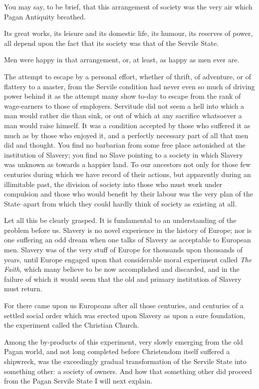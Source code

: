 \documentclass{book}
\begin{document}
You may say, to be brief, that this arrangement of society was the very air which Pagan Antiquity breathed.

Its great works, its leisure and its domestic life, its humour, its reserves of power, all depend upon the fact that its society was that of the Servile State.

Men were happy in that arrangement, or, at least, as happy as men ever are.

The attempt to escape by a personal effort, whether of thrift, of adventure, or of flattery to a master, from the Servile condition had never even so much of driving power behind it as the attempt many show to-day to escape from the rank of wage-earners to those of employers. Servitude did not seem a hell into which a man would rather die than sink, or out of which at any sacrifice whatsoever a man would raise himself. It was a condition accepted by those who suffered it as much as by those who enjoyed it, and a perfectly necessary part of all that men did and thought. You find no barbarian from some free place astonished at the institution of Slavery; you find no Slave pointing to a society in which Slavery was unknown as towards a happier land. To our ancestors not only for those few centuries during which we have record of their actions, but apparently during an illimitable past, the division of society into those who must work under compulsion and those who would benefit by their labour was the very plan of the State–apart from which they could hardly think of society as existing at all.

Let all this be clearly grasped. It is fundamental to an understanding of the problem before us. Slavery is no novel experience in the history of Europe; nor is one suffering an odd dream when one talks of Slavery as acceptable to European men. Slavery was of the very stuff of Europe for thousands upon thousands of years, until Europe engaged upon that considerable moral experiment called \emph{The Faith}, which many believe to be now accomplished and discarded, and in the failure of which it would seem that the old and primary institution of Slavery must return.

For there came upon us Europeans after all those centuries, and centuries of a settled social order which was erected upon Slavery as upon a sure foundation, the experiment called the Christian Church.

Among the by-products of this experiment, very slowly emerging from the old Pagan world, and not long completed before Christendom itself suffered a shipwreck, was the exceedingly gradual transformation of the Servile State into something other: a society of owners. And how that something other did proceed from the Pagan Servile State I will next explain.
\end{document}
